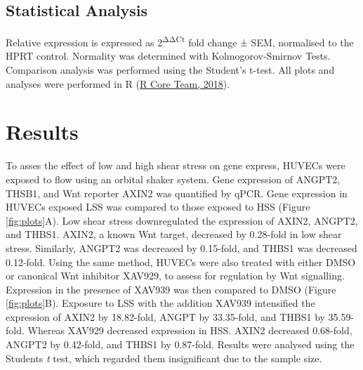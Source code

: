 \documentclass[
  11pt,
]{article}
\begin{document}
\hypertarget{statistical-analysis}{%
\subsection{Statistical Analysis}\label{statistical-analysis}}

Relative expression is expressed as 2\textsuperscript{ΔΔCt} fold change ± SEM, normalised to the HPRT control.
Normality was determined with Kolmogorov-Smirnov Tests.
Comparison analysis was performed using the Student's t-test.
All plots and analyses were performed in R (\protect\hyperlink{ref-R}{R Core Team, 2018}).

\hypertarget{results}{%
\section{Results}\label{results}}

To asses the effect of low and high shear stress on gene express, HUVECs were exposed to flow using an orbital shaker system.
Gene expression of ANGPT2, THSB1, and Wnt reporter AXIN2 was quantified by qPCR.
Gene expression in HUVECs exposed LSS was compared to those exposed to HSS (Figure \ref{fig:plots}A).
Low shear stress downregulated the expression of AXIN2, ANGPT2, and THBS1.
AXIN2, a known Wnt target, decreased by 0.28-fold in low shear stress.
Similarly, ANGPT2 was decreased by 0.15-fold, and THBS1 was decreased 0.12-fold.
Using the same method, HUVECs were also treated with either DMSO or canonical Wnt inhibitor XAV929, to assess for regulation by Wnt signalling.
Expression in the presence of XAV939 was then compared to DMSO (Figure \ref{fig:plots}B).
Exposure to LSS with the addition XAV939 intensified the expression of AXIN2 by 18.82-fold, ANGPT by 33.35-fold, and THBS1 by 35.59-fold.
Whereas XAV929 decreased expression in HSS.
AXIN2 decreased 0.68-fold, ANGPT2 by 0.42-fold, and THBS1 by 0.87-fold.
Results were analysed using the Students \emph{t} test, which regarded them insignificant due to the sample size.
\end{document}
